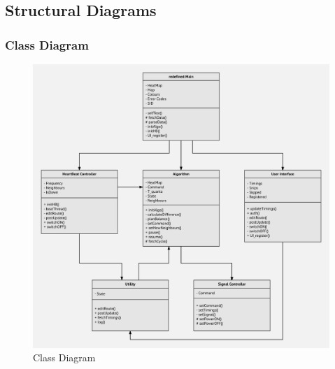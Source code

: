 \documentclass[12pt,a4paper,final]{report}
\begin{document}
	\newpage
\subsection{Structural Diagrams}
\subsubsection{Class Diagram}
	\begin{figure}[!h]
		\begin{center}
			\includegraphics[scale=0.6]{Diagrams/Class_Diagram.jpeg}
		\end{center}
		\caption{Class Diagram}
	\end{figure}
\newpage
\end{document}
